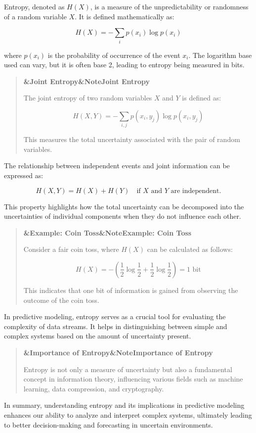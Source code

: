 \documentclass[a4paper]{article}
\newcommand{\boxheading}[1]{%
  \par\smallskip
  \noindent\textbf{\ifx&#1&Note\else#1\fi}\par
  \smallskip
}
\newenvironment{defbox}[1][]{%
  \begin{quote}\color{green!40!black}\boxheading{#1}\normalcolor
}{\end{quote}}
\newenvironment{exbox}[1][]{%
  \begin{quote}\color{brown!70!black}\boxheading{#1}\normalcolor
}{\end{quote}}
\newenvironment{rembox}[1][]{%
  \begin{quote}\color{black!70}\boxheading{#1}\normalcolor
}{\end{quote}}
\begin{document}
Entropy, denoted as \( H(X) \), is a measure of the unpredictability or randomness of a random variable \( X \). It is defined mathematically as:

\begin{equation}
H(X) = -\sum_{i} p(x_i) \log p(x_i)
\end{equation}

where \( p(x_i) \) is the probability of occurrence of the event \( x_i \). The logarithm base used can vary, but it is often base 2, leading to entropy being measured in bits.

\begin{defbox}[Joint Entropy]
The joint entropy of two random variables \( X \) and \( Y \) is defined as:

\begin{equation}
H(X, Y) = -\sum_{i,j} p(x_i, y_j) \log p(x_i, y_j)
\end{equation}

This measures the total uncertainty associated with the pair of random variables.
\end{defbox}

The relationship between independent events and joint information can be expressed as:

\begin{equation}
H(X, Y) = H(X) + H(Y) \quad \text{if } X \text{ and } Y \text{ are independent.}
\end{equation}

This property highlights how the total uncertainty can be decomposed into the uncertainties of individual components when they do not influence each other.

\begin{exbox}[Example: Coin Toss]
Consider a fair coin toss, where \( H(X) \) can be calculated as follows:

\begin{equation}
H(X) = -\left( \frac{1}{2} \log \frac{1}{2} + \frac{1}{2} \log \frac{1}{2} \right) = 1 \text{ bit}
\end{equation}

This indicates that one bit of information is gained from observing the outcome of the coin toss.
\end{exbox}

In predictive modeling, entropy serves as a crucial tool for evaluating the complexity of data streams. It helps in distinguishing between simple and complex systems based on the amount of uncertainty present.

\begin{rembox}[Importance of Entropy]
Entropy is not only a measure of uncertainty but also a fundamental concept in information theory, influencing various fields such as machine learning, data compression, and cryptography.
\end{rembox}

In summary, understanding entropy and its implications in predictive modeling enhances our ability to analyze and interpret complex systems, ultimately leading to better decision-making and forecasting in uncertain environments.
\end{document}
